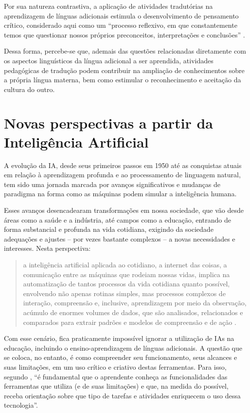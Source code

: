 \documentclass[portuguese]{textolivre}
\begin{document}
Por sua natureza contrastiva, a aplicação de atividades tradutórias na aprendizagem de línguas adicionais estimula o desenvolvimento de pensamento crítico, considerado aqui como um “processo reflexivo, em que constantemente temos que questionar nossos próprios preconceitos, interpretações e conclusões” \cite[p. 70]{buckingham2022}.

Dessa forma, percebe-se que, ademais das questões relacionadas diretamente com os aspectos linguísticos da língua adicional a ser aprendida, atividades pedagógicas de tradução podem contribuir na ampliação de conhecimentos sobre a própria língua materna, bem como estimular o reconhecimento e aceitação da cultura do outro.

\section{Novas perspectivas a partir da Inteligência Artificial}\label{sec-3}
A evolução da IA, desde seus primeiros passos em 1950 até as conquistas atuais em relação à aprendizagem profunda e ao processamento de linguagem natural, tem sido uma jornada marcada por avanços significativos e mudanças de paradigma na forma como as máquinas podem simular a inteligência humana.

Esses avanços desencadearam transformações em nossa sociedade, que vão desde áreas como a saúde e a indústria, até campos como a educação, entrando de forma substancial e profunda na vida cotidiana, exigindo da sociedade adequações e ajustes -- por vezes bastante complexos -- a novas necessidades e interesses. Nesta perspectiva:

\begin{quote}
a inteligência artificial aplicada ao cotidiano, a internet das coisas, a comunicação entre as máquinas que rodeiam nossas vidas, implica na automatização de tantos processos da vida cotidiana quanto possível, envolvendo não apenas rotinas simples, mas processos complexos de interação, compreensão e, inclusive, aprendizagem por meio da observação, acúmulo de enormes volumes de dados, que são analisados, relacionados e comparados para extrair padrões e modelos de compreensão e de ação \cite[p. 61]{perezgomez2021}.
\end{quote}

Com esse cenário, fica praticamente impossível ignorar a utilização de IAs na educação, incluindo o ensino-aprendizagem de línguas adicionais. A questão que se coloca, no entanto, é como compreender seu funcionamento, seus alcances e suas limitações, em um uso crítico e criativo destas ferramentas. Para isso, segundo \textcite[p. 357, tradução nossa]{munozbasols2024}, “é fundamental que o aprendente conheça as funcionalidades das ferramentas que utiliza (e de suas limitações) e que, na medida do possível, receba orientação sobre que tipo de tarefas e atividades enriquecem o uso dessa tecnologia”.
\end{document}
